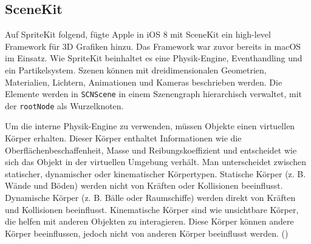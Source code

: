 \subsection{SceneKit} \label{sub:scene-kit}
Auf SpriteKit folgend, fügte Apple in iOS 8 mit SceneKit ein high-level Framework für 3D Grafiken hinzu. Das Framework war zuvor bereits in macOS im Einsatz. Wie SpriteKit beinhaltet es eine Physik-Engine, Eventhandling und ein Partikelsystem. Szenen können mit dreidimensionalen Geometrien, Materialien, Lichtern, Animationen und Kameras beschrieben werden. Die Elemente werden in \texttt{SCNScene} in einem Szenengraph hierarchisch verwaltet, mit der \texttt{rootNode} als Wurzelknoten.

Um die interne Physik-Engine zu verwenden, müssen Objekte einen virtuellen Körper erhalten. Dieser Körper enthaltet Informationen wie die Oberflächenbeschaffenheit, Masse und Reibungskoeffizient und entscheidet wie sich das Objekt in der virtuellen Umgebung verhält. Man unterscheidet zwischen statischer, dynamischer oder kinematischer Körpertypen. Statische Körper (z. B. Wände und Böden) werden nicht von Kräften oder Kollisionen beeinflusst. Dynamische Körper (z. B. Bälle oder Raumschiffe) werden direkt von Kräften und Kollisionen beeinflusst. Kinematische Körper sind wie unsichtbare Körper, die helfen mit anderen Objekten zu interagieren. Diese Körper können andere Körper beeinflussen, jedoch nicht von anderen Körper beeinflusst werden. (\cite{arkit-physics})

